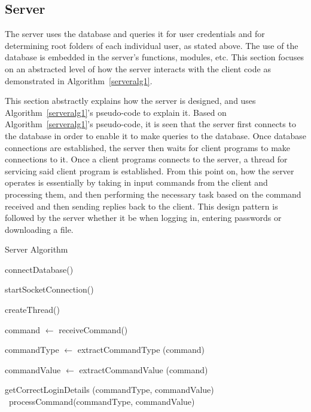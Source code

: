 \documentclass[journal, a4paper]{IEEEtran}
\begin{document}
\subsection{Server}
The server uses the database and queries it for user credentials and for determining root folders of each individual user, as stated above. The use of the database is embedded in the server's functions, modules, etc. This section focuses on an abstracted level of how the server interacts with the client code as demonstrated in Algorithm~\ref{serveralg1}. 

This section abstractly explains how the server is designed, and uses Algorithm~\ref{serveralg1}'s pseudo-code to explain it. Based on Algorithm~\ref{serveralg1}'s pseudo-code, it is seen that the server first connects to the database in order to enable it to make queries to the database. Once database connections are established, the server then waits for client programs to make connections to it. Once a client programs connects to the server, a thread for servicing said client program is established. From this point on, how the server operates is essentially by taking in input commands from the client and processing them, and then performing the necessary task based on the command received and then sending replies back to the client. This design pattern is followed by the server whether it be when logging in, entering passwords or downloading a file.


	\begin{algorithm}
	\caption{Server Algorithm}\label{serveralg1}
	\begin{algorithmic}[1]
		
		connectDatabase()
		
		startSocketConnection()
		
		 {
		\EndWhile
		
	
		createThread()
		
		command $\gets$ receiveCommand()
		
		commandType $\gets$ extractCommandType (command)
		
		commandValue $\gets$ extractCommandValue (command)
		
			getCorrectLoginDetails (commandType, commandValue)
		\Else~processCommand(commandType, commandValue)
		\EndIf
		
		}
		 
		\EndProcedure
	\end{algorithmic}
\end{algorithm}
\end{document}
